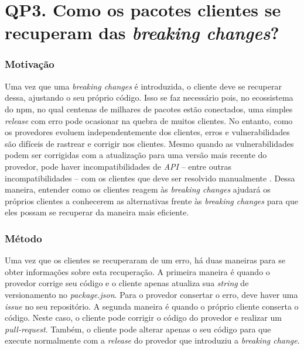 
\section{QP3. Como os pacotes clientes se recuperam das \textit{breaking changes}?}
\label{sec:qp3}

\subsubsection{Motivação}
\label{sec:qp3:motivation}

Uma vez que uma \textit{breaking changes} é introduzida, o cliente deve se recuperar dessa, ajustando o seu próprio código. Isso se faz necessário pois, no ecossistema do  \gls{npm}, no qual centenas de milhares de pacotes estão conectados, uma simples \textit{release} com erro pode ocasionar na quebra de muitos clientes. No entanto, como os provedores evoluem independentemente dos clientes, erros e vulnerabilidades são difíceis de rastrear e corrigir nos clientes. Mesmo quando as vulnerabilidades podem ser corrigidas com a atualização para uma versão mais recente do provedor, pode haver incompatibilidades de \textit{API} -- entre outras incompatibilidades -- com os clientes que deve ser resolvido manualmente \cite{Foo:2018:ESC:3236024.3275535}. Dessa maneira, entender como os clientes reagem às \textit{breaking changes} ajudará os próprios clientes a conhecerem as alternativas frente às \textit{breaking changes} para que eles possam se recuperar da maneira mais eficiente.

\subsubsection{Método}
\label{sec:qp3:approach}
Uma vez que os clientes se recuperaram de um erro, há duas maneiras para se obter informações sobre esta recuperação. A primeira maneira é quando o provedor corrige seu código e o cliente apenas atualiza sua \textit{string} de versionamento no \textit{package.json}. Para o provedor consertar o erro, deve haver uma \textit{issue} no seu repositório. A segunda maneira é quando o próprio cliente conserta o código. Neste caso, o cliente pode corrigir o código do provedor e realizar um \textit{pull-request}. Também, o cliente pode alterar apenas o seu código para que execute normalmente com a \textit{release} do provedor que introduziu a \textit{breaking change}.

